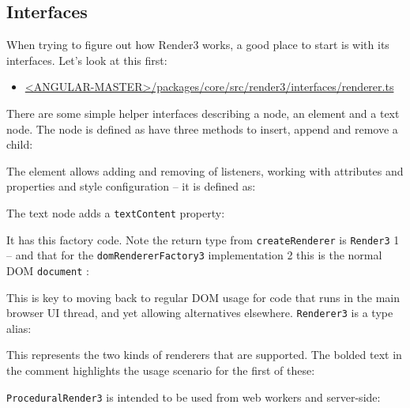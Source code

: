 \subsection{Interfaces}

When trying to figure out how Render3 works, a good place to start is with its
interfaces. Let’s look at this first:

\begin{itemize}
  \item \href{https://github.com/angular/angular/blob/master/packages/core/src/render3/interfaces/renderer.ts}
        {<ANGULAR-MASTER>/packages/core/src/render3/interfaces/renderer.ts}
\end{itemize}

There are some simple helper interfaces describing a node, an element and a text
node. The node is defined as have three methods to insert, append and remove a
child:



The element allows adding and removing of listeners, working with attributes and
properties and style configuration – it is defined as:



The text node adds a
\texttt{textContent}
property:



It has this factory code. Note the return type from
\texttt{createRenderer}
is
\texttt{Render3}
1
–
and that for the
\texttt{domRendererFactory3}
implementation
2
this is the normal DOM
\texttt{document}
:



This is key to moving back to regular DOM usage for code that runs in the main
browser UI thread, and yet allowing alternatives elsewhere.
\texttt{Renderer3}
is a type alias:



This represents the two kinds of renderers that are supported. The bolded text in the
comment highlights the usage scenario for the first of these:



\texttt{ProceduralRender3}
is intended to be used from web workers and server-side:



